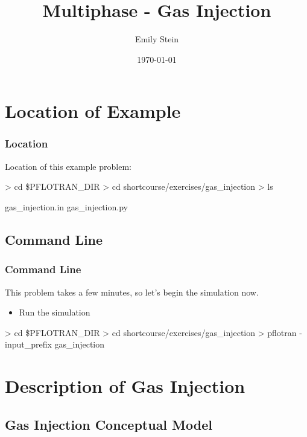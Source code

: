 \documentclass{beamer}
\begin{document}
\title{Multiphase - Gas Injection}
\author{Emily Stein}
\date{\today}


\section{Location of Example}

\begin{frame}\frametitle{Location}

Location of this example problem:

\begin{semiverbatim}
> cd \$PFLOTRAN_DIR
> cd shortcourse/exercises/gas_injection
> ls

gas_injection.in
gas_injection.py
\end{semiverbatim}

\end{frame}

\subsection{Command Line}
\begin{frame}[fragile]\frametitle{Command Line}
This problem takes a few minutes, so let's begin the simulation now.

\begin{itemize}
  \item Run the simulation
\end{itemize}

\begin{semiverbatim}
> cd \$PFLOTRAN_DIR
> cd shortcourse/exercises/gas_injection
> pflotran -input_prefix gas_injection
\end{semiverbatim}

\end{frame}

\section{Description of Gas Injection}

\subsection{Gas Injection Conceptual Model}
\end{document}
